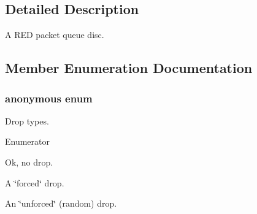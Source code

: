 \subsection{Detailed Description}
A R\+ED packet queue disc. 

\subsection{Member Enumeration Documentation}
\subsubsection[{\texorpdfstring{anonymous enum}{anonymous enum}}]{\setlength{\rightskip}{0pt plus 5cm}anonymous enum}\hypertarget{classns3_1_1RedQueueDisc_a9599a29f6ed3cfc742e7b1c6acd81b0c}{}\label{classns3_1_1RedQueueDisc_a9599a29f6ed3cfc742e7b1c6acd81b0c}


Drop types. 

\begin{Desc}
\item[Enumerator]\par
\begin{description}
\item[{\em 
D\+T\+Y\+P\+E\+\_\+\+N\+O\+NE\hypertarget{classns3_1_1RedQueueDisc_a9599a29f6ed3cfc742e7b1c6acd81b0ca875c18e83b2c08e443231f98a46f104c}{}\label{classns3_1_1RedQueueDisc_a9599a29f6ed3cfc742e7b1c6acd81b0ca875c18e83b2c08e443231f98a46f104c}
}]Ok, no drop. \item[{\em 
D\+T\+Y\+P\+E\+\_\+\+F\+O\+R\+C\+ED\hypertarget{classns3_1_1RedQueueDisc_a9599a29f6ed3cfc742e7b1c6acd81b0ca65211b6708c279be68d252f83012f2a9}{}\label{classns3_1_1RedQueueDisc_a9599a29f6ed3cfc742e7b1c6acd81b0ca65211b6708c279be68d252f83012f2a9}
}]A \char`\"{}forced\char`\"{} drop. \item[{\em 
D\+T\+Y\+P\+E\+\_\+\+U\+N\+F\+O\+R\+C\+ED\hypertarget{classns3_1_1RedQueueDisc_a9599a29f6ed3cfc742e7b1c6acd81b0ca3facf8866765dbac0549784f2dbee8c3}{}\label{classns3_1_1RedQueueDisc_a9599a29f6ed3cfc742e7b1c6acd81b0ca3facf8866765dbac0549784f2dbee8c3}
}]An \char`\"{}unforced\char`\"{} (random) drop. \end{description}
\end{Desc}

